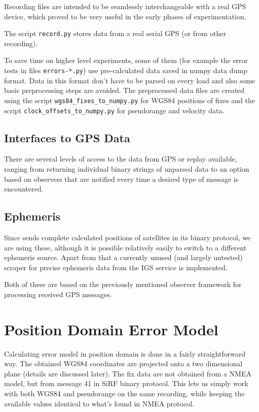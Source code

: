 Recording files are intended to be seamlessly interchangeable with a real GPS device,
which proved to be very useful in the early phases of experimentation.

The script \verb=record.py= stores data from a real serial GPS (or from other recording).

To save time on higher level experiments, some of them (for example the error tests
in files \verb=errors-*.py=)
use pre-calculated data saved in numpy data dump format.
Data in this format don't have to be parsed on every load and also some basic
preprocessing steps are avoided.
The preprocessed data files are created using the script \verb=wgs84_fixes_to_numpy.py=
for WGS84 positions of fixes and the script \verb=clock_offsets_to_numpy.py= for pseudorange
and velocity data.

\subsection{Interfaces to GPS Data}
There are several levels of access to the data from GPS or replay available,
ranging from returning individual binary strings of unparsed data to an option based
on observers that are notified every time a desired type of message is encountered.

\subsection{Ephemeris}
Since \sirf sends complete calculated positions of satellites in its binary
protocol, we are using these, although it is possible relatively easily to switch
to a different ephemeris source.
Apart from that a currently unused (and largely untested) scraper for precise
ephemeris data from the IGS service \cite{orbit-data} is implemented.

Both of these are based on the previously mentioned observer framework for processing
received GPS messages.

\section{Position Domain Error Model}
Calculating error model in position domain is done in a fairly straightforward way.
The obtained WGS84 coordinates are projected onto a two dimensional plane
(details are discussed later).
The fix data are not obtained from a NMEA model, but from message 41 in SiRF
binary protocol.
This lets us simply work with both WGS84 and pseudorange on the same recording,
while keeping the available values identical to what's found in NMEA protocol.

